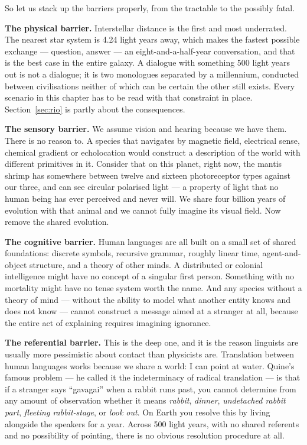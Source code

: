 So let us stack up the barriers properly, from the tractable to the possibly fatal.

\textbf{The physical barrier.} Interstellar distance is the first and most underrated. The nearest
star system is 4.24 light years away, which makes the fastest possible exchange --- question, answer
--- an eight-and-a-half-year conversation, and that is the best case in the entire galaxy. A dialogue
with something 500 light years out is not a dialogue; it is two monologues separated by a
millennium, conducted between civilisations neither of which can be certain the other still exists.
Every scenario in this chapter has to be read with that constraint in place. Section~\ref{sec:rio}
is partly about the consequences.

\textbf{The sensory barrier.} We assume vision and hearing because we have them. There is no reason
to. A species that navigates by magnetic field, electrical sense, chemical gradient or echolocation
would construct a description of the world with different primitives in it. Consider that on this
planet, right now, the mantis shrimp has somewhere between twelve and sixteen photoreceptor types
against our three, and can see circular polarised light --- a property of light that no human being
has ever perceived and never will. We share four billion years of evolution with that animal and we
cannot fully imagine its visual field. Now remove the shared evolution.

\textbf{The cognitive barrier.} Human languages are all built on a small set of shared
foundations: discrete symbols, recursive grammar, roughly linear time, agent-and-object structure,
and a theory of other minds.  A distributed or colonial intelligence might have no concept of a singular first
person. Something with no mortality might have no tense system worth the name. And any species
without a theory of mind --- without the ability to model what another entity knows and does not know
--- cannot construct a message aimed at a stranger at all, because the entire act of explaining
requires imagining ignorance.

\textbf{The referential barrier.} This is the deep one, and it is the reason linguists are usually
more pessimistic about contact than physicists are. Translation between human languages works because
we share a world: I can point at water. Quine's famous problem --- he called it the indeterminacy of
radical translation --- is that if a stranger says ``gavagai'' when a rabbit runs past, you cannot
determine from any amount of observation whether it means \emph{rabbit}, \emph{dinner},
\emph{undetached rabbit part}, \emph{fleeting rabbit-stage}, or \emph{look out}. On Earth you resolve
this by living alongside the speakers for a year. Across 500 light years, with no shared referents
and no possibility of pointing, there is no obvious resolution procedure at all.

